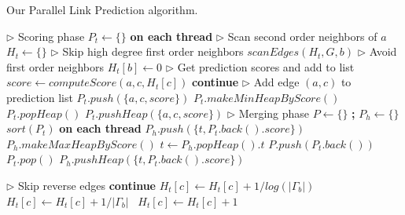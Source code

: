 \begin{algorithm}[hbtp]
\caption{Our Parallel Link Prediction algorithm.}
\label{alg:predict}
\begin{algorithmic}[1]

\Statex

 \label{alg:predict--begin}
  \State $\rhd$ Scoring phase
  \State $P_t \gets \{\}$ \textbf{on each thread} \label{alg:predict--scoring-begin}
    \State $\rhd$ Scan second order neighbors of $a$
    \State $H_t \gets \{\}$
      \State $\rhd$ Skip high degree first order neighbors
       $scanEdges(H_t, G, b)$
      \EndIf
    \EndFor
    \State $\rhd$ Avoid first order neighbors
     $H_t[b] \gets 0$ \label{alg:predict--avoid-neighbors1}
    \EndFor
    \State $\rhd$ Get prediction scores and add to list
      \State $score \gets computeScore(a, c, H_t[c])$
       \textbf{continue}
      \EndIf
      \State $\rhd$ Add edge $(a, c)$ to prediction list
        \State $P_t.push(\{a, c, score\})$
         $P_t.makeMinHeapByScore()$
        \EndIf
        \State $P_t.popHeap()$
        \State $P_t.pushHeap(\{a, c, score\})$
      \EndIf
    \EndFor
  \EndFor \label{alg:predict--scoring-end}
  \State $\rhd$ Merging phase \label{alg:predict--merging-begin}
  \State $P \gets \{\}$ \textbf{;} $P_h \gets \{\}$
  \State $sort(P_t)$ \textbf{on each thread}
     $P_h.push(\{t, P_t.back().score\})$
    \EndIf
  \EndFor
  \State $P_h.makeMaxHeapByScore()$ 
   \label{alg:predict--merge-loop-begin}
    \State $t \gets P_h.popHeap().t$
    \State $P.push(P_t.back())$
    \State $P_t.pop()$
     $P_h.pushHeap(\{t, P_t.back().score\})$
    \EndIf
  \EndWhile \label{alg:predict--merging-end}
\EndFunction \label{alg:predict--end}

\Statex

 \label{alg:predict--scan-begin}
    \State $\rhd$ Skip reverse edges
     \textbf{continue}
    \EndIf
     $H_t[c] \gets H_t[c] + 1 / log(|\Gamma_b|)$
     $H_t[c] \gets H_t[c] + 1 / |\Gamma_b|$
    \Else\ $H_t[c] \gets H_t[c] + 1$
    \EndIf
  \EndFor
\EndFunction \label{alg:predict--scan-end}
\end{algorithmic}
\end{algorithm}
